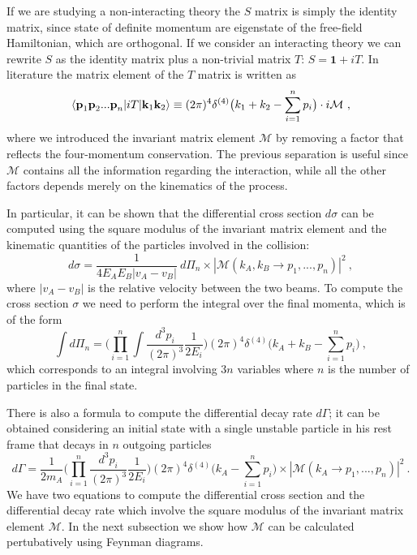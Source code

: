 \documentclass[../main/main.tex]{subfiles}
\begin{document}
If we are studying a non-interacting theory the $S$ matrix is simply the identity matrix, since state of
definite momentum are eigenstate of the free-field Hamiltonian, which are orthogonal. If we consider an interacting theory we can rewrite $S$ as the identity matrix plus a non-trivial matrix $T$: $S = \textbf{1}+ i T$.
\newline
In literature the matrix element of the $T$ matrix is written as
\begin{equation}
	\label{first matrix element}
	\braket{\textbf{p}_1\textbf{p}_2 ... \textbf{p}_n |i T | \textbf{k}_1 \textbf{k}_2 } \equiv 
	(2 \pi)^4 \delta^{(4)}\big(k_1+k_2- \sum_{i=1}^n p_i\big) \cdot i \mathcal{M} \ ,
\end{equation}
where we introduced the invariant matrix element $\mathcal{M}$ by removing a factor that reflects the four-momentum conservation.
The previous separation is useful since $\mathcal{M}$ contains all the information regarding the interaction, while all the other factors depends merely on the kinematics of the process.

In particular, it can be shown that the differential cross section $d\sigma$ can be computed using the square modulus of the invariant 
matrix element and the kinematic quantities of the particles involved in the collision:
\begin{equation}
	\label{sigma}
	d \sigma = \frac{1}{4 E_A E_B |v_A - v_B|} \  d\Pi_n \times |\mathcal{M}(k_A, k_B \to p_1, ..., p_n)|^2  \ ,
\end{equation}
where $ |v_A - v_B|$ is the relative velocity between the two beams.  To compute the cross section $\sigma$ we need to perform the integral over the final momenta, which is of the form
\begin{equation}
	\int d\Pi_n  = \bigg( \prod_{i=1}^{n}\int
	\frac{d^3 p_i}{(2 \pi)^3}
	\frac{1}{2 E_i} \bigg) (2\pi)^4 \delta^{(4)}\big(k_A+ k_B- \sum_{i=1}^n p_i\big) \ ,
\end{equation} 
which corresponds to an integral involving $3n$ variables where $n$ is the number of particles in the final state.

There is also a formula to compute the differential decay rate $d\Gamma$; it can be obtained considering an initial state with a single
unstable particle in his rest frame that decays in $n$ outgoing particles
\begin{equation}
	d\Gamma = \frac{1}{2 m_A} \bigg( \prod_{i=1}^{n}
	\frac{d^3 p_i}{(2 \pi)^3}
	\frac{1}{2 E_i} \bigg) (2\pi)^4 \delta^{(4)}\big(k_A- \sum_{i=1}^n p_i\big) \times |\mathcal{M}(k_A \to p_1, ..., p_n)|^2 \ .
\end{equation}
We have two equations to compute the differential cross section and the differential decay rate which involve the square modulus of 
the invariant matrix element $\mathcal{M}$. In the next subsection we show how $\mathcal{M}$ can be calculated pertubatively using Feynman diagrams.
\end{document}
